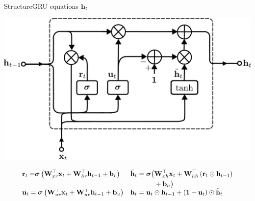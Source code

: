 \documentclass{beamer}
\begin{document}
\begin{frame}{Structure}{GRU equations ${\bf h}_t$}
\begin{center}
    \includegraphics[scale=0.4]{Module 5 (RNN)/pics/gate_recurrent_unit.pdf}
\end{center}

\vspace{-0.8cm}

\begin{equation}
\begin{array}{ll}
    \begin{split}
    {\bf r}_t  =& {\boldsymbol \sigma}\left({\bf W}_{xr}^\top {\bf x}_t + {\bf W}_{hr}^\top {\bf h}_{t-1} +{\bf b}_r\right) \\
    &
    \end{split}
    &  
    \begin{split}
    \tilde{{\bf h}}_t   = {\boldsymbol \sigma}\big(&{\bf W}_{xh}^\top {\bf x}_t + {\bf W}_{hh}^\top \left({\bf r}_t \odot {\bf h}_{t-1}\right)\\
    &+{\bf b}_h\big)
    \end{split}
    \\
    {\bf u}_t  ={\boldsymbol \sigma}\left({\bf W}_{ur}^\top {\bf x}_t + {\bf W}_{ur}^\top {\bf h}_{t-1} +{\bf b}_u\right) &
    {\bf h}_t  = {\bf u}_t \odot {\bf h}_{t-1} + \left({\bf 1} - {\bf u}_t \right) \odot \tilde{{\bf h}}_t\\
\end{array}
\end{equation}


\end{frame}
\end{document}
